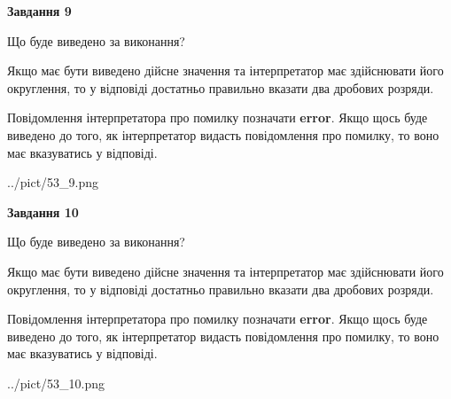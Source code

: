 \documentclass[12pt, ukrainian]{article}
\begin{document}
{\begin {Large}
{\begin {center}\textbf{Завдання 9}\end {center}}\par
Що буде виведено за виконання? \par

Якщо має бути виведено дійсне значення та інтерпретатор має здійснювати його округлення, 
то у відповіді достатньо правильно вказати два дробових розряди.

Повідомлення інтерпретатора про помилку позначати \textbf{error}.
Якщо щось буде виведено до того, як інтерпретатор видасть повідомлення про помилку, 
то воно має вказуватись у відповіді. \par

\begin{center}
	{../pict/53_9.png}
\end{center}
\newpage

{\begin {center}\textbf{Завдання 10}\end {center}}\par
Що буде виведено за виконання? \par

Якщо має бути виведено дійсне значення та інтерпретатор має здійснювати його округлення, 
то у відповіді достатньо правильно вказати два дробових розряди.

Повідомлення інтерпретатора про помилку позначати \textbf{error}.
Якщо щось буде виведено до того, як інтерпретатор видасть повідомлення про помилку, 
то воно має вказуватись у відповіді. \par

\begin{center}
	{../pict/53_10.png}
\end{center}
\newpage

\end {Large}}
\end{document}
